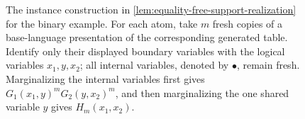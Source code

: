 \documentclass[11pt]{article}
\theoremstyle{plain}
\theoremstyle{definition}
\theoremstyle{remark}
\newcommand{\cF}{\mathcal F}
\begin{document}
\begin{figure}[!t]
{%
  }
  \caption{The instance construction in
  \cref{lem:equality-free-support-realization} for the binary example.
  For each atom, take $m$ fresh copies of a base-language presentation of
  the corresponding generated table.  Identify only their displayed
  boundary variables with the logical variables $x_1,y,x_2$; all internal
  variables, denoted by $\bullet$, remain fresh.  Marginalizing the internal
  variables first gives
  $G_1(x_1,y)^mG_2(y,x_2)^m$, and then marginalizing the one shared variable
  $y$ gives $H_m(x_1,x_2)$.}
  \label{fig:equality-free-support-construction}
\end{figure}
\end{document}
